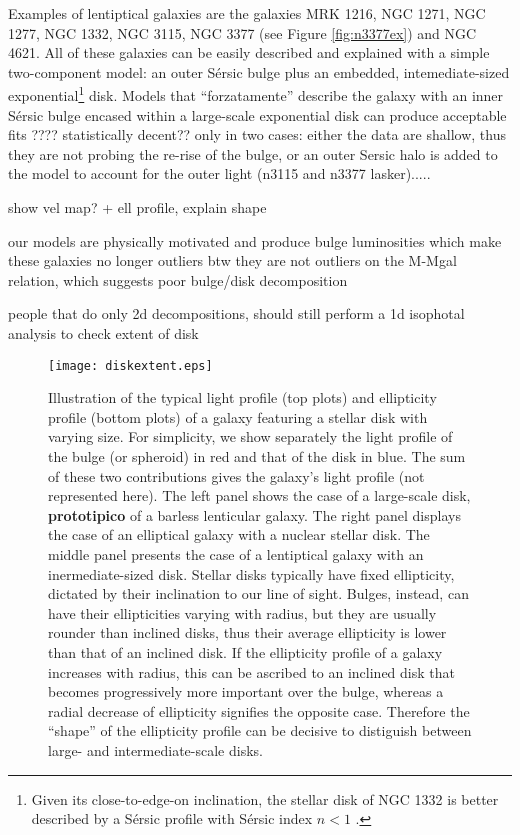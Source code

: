 \documentclass[12pt,preprint]{nature}
\begin{document}
Examples of lentiptical galaxies are the galaxies MRK 1216, NGC 1271, NGC 1277, NGC 1332, NGC 3115, NGC 3377 
(see Figure \ref{fig:n3377ex}) and NGC 4621. 
All of these galaxies can be easily described and explained with a simple two-component model: 
an outer S\'ersic bulge plus an embedded, intemediate-sized exponential\footnote{Given 
its close-to-edge-on inclination,  
the stellar disk of NGC 1332 is better described by a S\'ersic profile with S\'ersic index $n<1$ 
\citep{pastrav2013a,pastrav2013b}.} disk. 
Models that ``forzatamente'' describe the galaxy with an inner S\'ersic bulge 
encased within a large-scale exponential disk can produce acceptable fits ???? statistically decent??
only in two cases:
either the data are shallow, thus they are not probing the re-rise of the bulge, 
or an outer Sersic halo is added to the model to account for the outer light (n3115 and n3377 lasker).....





show vel map? + ell profile, explain shape


our models are physically motivated and produce bulge luminosities which make these galaxies no longer outliers
btw they are not outliers on the M-Mgal relation, which suggests poor bulge/disk decomposition



people that do only 2d decompositions, should still perform a 1d isophotal analysis to check extent of disk


 


\begin{figure}
\texttt{[image: diskextent.eps]}
\caption{Illustration of the typical light profile (top plots) and ellipticity profile (bottom plots) of a galaxy 
featuring a stellar disk with varying size. 
For simplicity, we show separately the light profile of the bulge (or spheroid) in red 
and that of the disk in blue. 
The sum of these two contributions gives the galaxy's light profile (not represented here).
The left panel shows the case of a large-scale disk, {\bf prototipico} of a barless lenticular galaxy. 
The right panel displays the case of an elliptical galaxy with a nuclear stellar disk. 
The middle panel presents the case of a lentiptical galaxy with an inermediate-sized disk. 
Stellar disks typically have fixed ellipticity, dictated by their inclination to our line of sight.
Bulges, instead, can have their ellipticities varying with radius,
but they are usually rounder than inclined disks, 
thus their average ellipticity is lower than that of an inclined disk.
If the ellipticity profile of a galaxy increases with radius, 
this can be ascribed to an inclined disk that becomes progressively more important over the bulge,
whereas a radial decrease of ellipticity signifies the opposite case. 
Therefore the ``shape'' of the ellipticity profile can be decisive to distiguish between 
large- and intermediate-scale disks. 
}
\label{fig:ellp}
\end{figure}
\end{document}
